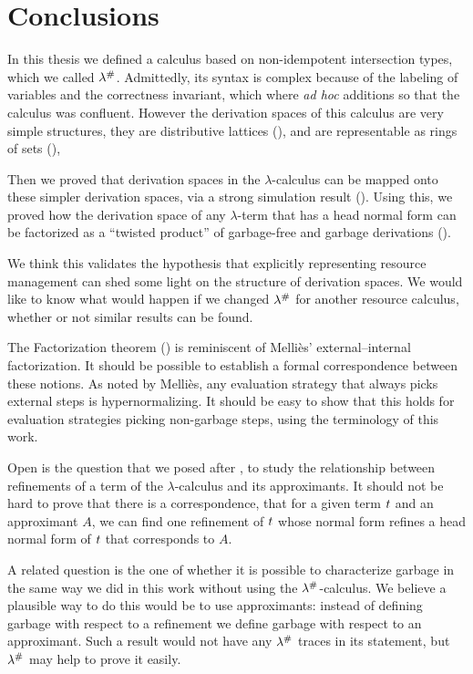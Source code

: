 \chapter{Conclusions}
\label{ch:conclusions}

In this thesis we defined a calculus based on non-idempotent intersection types,
which we called $\lambda^{\mathtt{\#}}$.
Admittedly, its syntax is complex because of the labeling of variables
and the correctness invariant, which where \textit{ad hoc}
additions so that the calculus was confluent.
However the derivation spaces of this calculus are very simple structures,
they are distributive lattices (),
and are representable as rings of sets (),

Then we proved that derivation spaces in the $\lambda$-calculus
can be mapped onto these simpler derivation spaces, via a strong
simulation result ().
Using this, we proved how the derivation space of any $\lambda$-term that has a
head normal form can be factorized as a ``twisted product'' of garbage-free
and garbage derivations ().

We think this validates the hypothesis that explicitly representing resource
management can shed some light on the structure of derivation spaces.
We would like to know what would happen if we changed $\lambda^{\mathtt{\#}}$ for
another resource calculus, whether or not similar results can be found.

The Factorization theorem ()
is reminiscent of Melliès’ \cite{DBLP:conf/ctcs/Mellies97} external--internal
factorization. It should be possible to establish a formal correspondence between these
notions. As noted by Melliès, any evaluation strategy that always picks external steps is
hypernormalizing. It should be easy to show that this holds for evaluation strategies picking
non-garbage steps, using the terminology of this work.

Open is the question that we posed after ,
to study the relationship between refinements of a term of the $\lambda$-calculus
and its approximants.
It should not be hard to prove that there is a correspondence,
\ie that for a given term $t$ and an approximant $A$,
we can find one refinement of $t$ whose normal form refines a head normal form of $t$
that corresponds to $A$.

A related question is the one of whether it is possible to characterize garbage in the same
way we did in this work without using the $\lambda^{\mathtt{\#}}$-calculus.
We believe a plausible way to do this would be to use approximants:
instead of defining garbage with respect to a refinement we define garbage
with respect to an approximant.
Such a result would not have any $\lambda^{\mathtt{\#}}$ traces in its statement,
but $\lambda^{\mathtt{\#}}$ may help to prove it easily.

